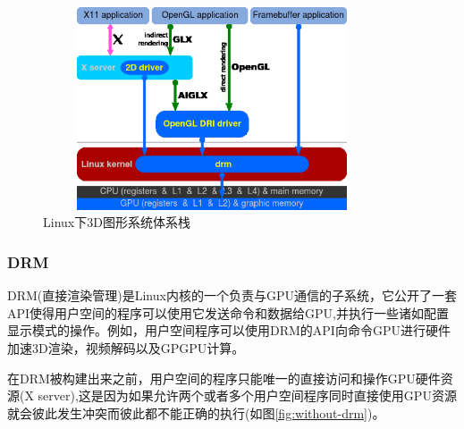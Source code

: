 \begin{figure}[H] 
  \centering
  \includegraphics[width=10cm,height=6cm]{figures/chap01/OpenGL_With_Direct_Rendering}
  \caption{Linux下3D图形系统体系栈}
  \label{fig:OpenGL_With_Direct_Rendering}
\end{figure}

\subsubsection{DRM}
DRM(直接渲染管理)是Linux内核的一个负责与GPU通信的子系统，它公开了一套API使得用户空间的程序可以使用它发送命令和数据给GPU,并执行一些诸如配置显示模式的操作\cite{Linux-DRM}。例如，用户空间程序可以使用DRM的API向命令GPU进行硬件加速3D渲染，视频解码以及GPGPU计算。

在DRM被构建出来之前，用户空间的程序只能唯一的直接访问和操作GPU硬件资源(X server),这是因为如果允许两个或者多个用户空间程序同时直接使用GPU资源就会彼此发生冲突而彼此都不能正确的执行(如图\ref{fig:without-drm})。

